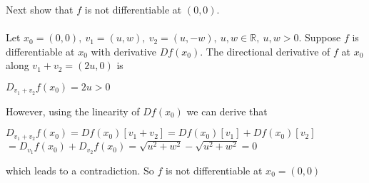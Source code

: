 \documentclass[12pt,a4paper,titlepage]{article}
\begin{document}
Next show that $f$ is not differentiable at $(0,0)$. \\\\
Let $x_0=(0,0), \: v_1=(u,w), \: v_2=(u,-w), \: u,w \in \mathbb{R}, \:u,w>0$.
Suppose $f$ is differentiable at $x_0$ with derivative $Df(x_0)$.
The directional derivative of $f$ at $x_0$ along $v_1+v_2=(2u,0)$ is\\
\begin{center}
	$D_{v_1+v_2}f(x_0) = 2u > 0$
\end{center}
However, using the linearity of $Df(x_0)$ we can derive that
\begin{center}
$D_{v_1+v_2}f(x_0) = Df(x_0)[v_1+v_2] = Df(x_0)[v_1] + Df(x_0)[v_2]$\\ \vspace{1em}
$=D_{v_1}f(x_0)+D_{v_2}f(x_0) = \sqrt{u^2+w^2}-\sqrt{u^2+w^2}=0$\\
\end{center}
which leads to a contradiction. So $f$ is not differentiable at $x_0=(0,0)$\\\\
\end{document}
